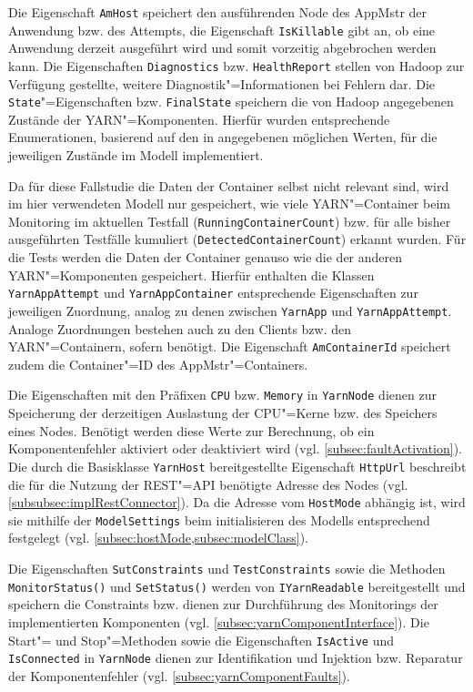 Die Eigenschaft \texttt{AmHost} speichert den ausführenden Node des \gls{AppMstr} der Anwendung bzw. des Attempts, die Eigenschaft \texttt{IsKillable} gibt an, ob eine Anwendung derzeit ausgeführt wird und somit vorzeitig abgebrochen werden kann.
Die Eigenschaften \texttt{Diagnostics} bzw. \texttt{HealthReport} stellen von Hadoop zur Verfügung gestellte, weitere Diagnostik"=Informationen bei Fehlern dar.
Die \texttt{State}"=Eigenschaften bzw. \texttt{FinalState} speichern die von Hadoop angegebenen Zustände der YARN"=Komponenten.
Hierfür wurden entsprechende Enumerationen, basierend auf den in \cite{HadoopRmApi271} angegebenen möglichen Werten, für die jeweiligen Zustände im Modell implementiert.

Da für diese Fallstudie die Daten der Container selbst nicht relevant sind, wird im hier verwendeten Modell nur gespeichert, wie viele YARN"=Container beim Monitoring im aktuellen Testfall (\texttt{RunningContainerCount}) bzw. für alle bisher ausgeführten Testfälle kumuliert (\texttt{DetectedContainerCount}) erkannt wurden.
Für die Tests \cite{Eberhardinger2018} werden die Daten der Container genauso wie die der anderen YARN"=Komponenten gespeichert.
Hierfür enthalten die Klassen \texttt{YarnAppAttempt} und \texttt{YarnAppContainer} entsprechende Eigenschaften zur jeweiligen Zuordnung, analog zu denen zwischen \texttt{YarnApp} und \texttt{YarnAppAttempt}.
Analoge Zuordnungen bestehen auch zu den Clients bzw. den YARN"=Containern, sofern benötigt.
Die Eigenschaft \texttt{AmContainerId} speichert zudem die Container"=ID des \gls{AppMstr}"=Containers.

Die Eigenschaften mit den Präfixen \texttt{CPU} bzw. \texttt{Memory} in \texttt{YarnNode} dienen zur Speicherung der derzeitigen Auslastung der CPU"=Kerne bzw. des Speichers eines Nodes.
Benötigt werden diese Werte zur Berechnung, ob ein Komponentenfehler aktiviert oder deaktiviert wird (vgl. \cref{subsec:faultActivation}).
Die durch die Basisklasse \texttt{YarnHost} bereitgestellte Eigenschaft \texttt{HttpUrl} beschreibt die für die Nutzung der REST"=API benötigte Adresse des Nodes (vgl. \cref{subsubsec:implRestConnector}).
Da die Adresse vom \texttt{HostMode} abhängig ist, wird sie mithilfe der \texttt{ModelSettings} beim initialisieren des Modells entsprechend festgelegt (vgl. \cref{subsec:hostMode,subsec:modelClass}).

Die Eigenschaften \texttt{SutConstraints} und \texttt{TestConstraints} sowie die Methoden \texttt{MonitorStatus()} und \texttt{SetStatus()} werden von \texttt{IYarnReadable} bereitgestellt und speichern die Constraints bzw. dienen zur Durchführung des Monitorings der implementierten Komponenten (vgl. \cref{subsec:yarnComponentInterface}).
Die Start"= und Stop"=Methoden sowie die Eigenschaften \texttt{IsActive} und \texttt{IsConnected} in \texttt{YarnNode} dienen zur Identifikation und Injektion bzw. Reparatur der Komponentenfehler (vgl. \cref{subsec:yarnComponentFaults}).

